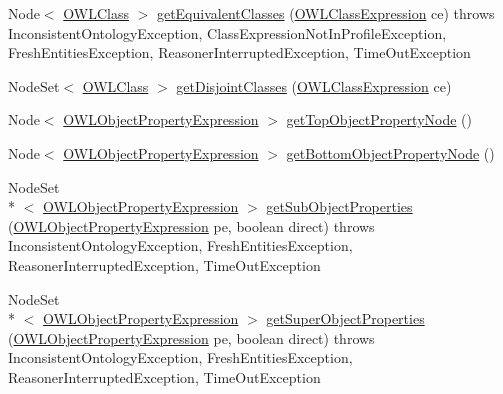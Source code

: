 \begin{DoxyCompactItemize}
\item 
Node$<$ \hyperlink{interfaceorg_1_1semanticweb_1_1owlapi_1_1model_1_1_o_w_l_class}{O\-W\-L\-Class} $>$ \hyperlink{classorg_1_1semanticweb_1_1owlapi_1_1reasoner_1_1structural_1_1_structural_reasoner_a41065ed19078e0e25c35153c2a22b53e}{get\-Equivalent\-Classes} (\hyperlink{interfaceorg_1_1semanticweb_1_1owlapi_1_1model_1_1_o_w_l_class_expression}{O\-W\-L\-Class\-Expression} ce)  throws Inconsistent\-Ontology\-Exception, Class\-Expression\-Not\-In\-Profile\-Exception, Fresh\-Entities\-Exception, Reasoner\-Interrupted\-Exception, Time\-Out\-Exception 
\item 
Node\-Set$<$ \hyperlink{interfaceorg_1_1semanticweb_1_1owlapi_1_1model_1_1_o_w_l_class}{O\-W\-L\-Class} $>$ \hyperlink{classorg_1_1semanticweb_1_1owlapi_1_1reasoner_1_1structural_1_1_structural_reasoner_a86e6fd413dccfed789d9855aa0d7c23d}{get\-Disjoint\-Classes} (\hyperlink{interfaceorg_1_1semanticweb_1_1owlapi_1_1model_1_1_o_w_l_class_expression}{O\-W\-L\-Class\-Expression} ce)
\item 
Node$<$ \hyperlink{interfaceorg_1_1semanticweb_1_1owlapi_1_1model_1_1_o_w_l_object_property_expression}{O\-W\-L\-Object\-Property\-Expression} $>$ \hyperlink{classorg_1_1semanticweb_1_1owlapi_1_1reasoner_1_1structural_1_1_structural_reasoner_a6e5ba65666e4ef1ba47b62392cca1b34}{get\-Top\-Object\-Property\-Node} ()
\item 
Node$<$ \hyperlink{interfaceorg_1_1semanticweb_1_1owlapi_1_1model_1_1_o_w_l_object_property_expression}{O\-W\-L\-Object\-Property\-Expression} $>$ \hyperlink{classorg_1_1semanticweb_1_1owlapi_1_1reasoner_1_1structural_1_1_structural_reasoner_ad8d4e20224afa7fa0f3e59549b979893}{get\-Bottom\-Object\-Property\-Node} ()
\item 
Node\-Set\\*
$<$ \hyperlink{interfaceorg_1_1semanticweb_1_1owlapi_1_1model_1_1_o_w_l_object_property_expression}{O\-W\-L\-Object\-Property\-Expression} $>$ \hyperlink{classorg_1_1semanticweb_1_1owlapi_1_1reasoner_1_1structural_1_1_structural_reasoner_ae04701c3c9c671b10b2a1c9b6c941911}{get\-Sub\-Object\-Properties} (\hyperlink{interfaceorg_1_1semanticweb_1_1owlapi_1_1model_1_1_o_w_l_object_property_expression}{O\-W\-L\-Object\-Property\-Expression} pe, boolean direct)  throws Inconsistent\-Ontology\-Exception, Fresh\-Entities\-Exception, Reasoner\-Interrupted\-Exception, Time\-Out\-Exception 
\item 
Node\-Set\\*
$<$ \hyperlink{interfaceorg_1_1semanticweb_1_1owlapi_1_1model_1_1_o_w_l_object_property_expression}{O\-W\-L\-Object\-Property\-Expression} $>$ \hyperlink{classorg_1_1semanticweb_1_1owlapi_1_1reasoner_1_1structural_1_1_structural_reasoner_abacb01a7f4d61ff377785063de0cb67e}{get\-Super\-Object\-Properties} (\hyperlink{interfaceorg_1_1semanticweb_1_1owlapi_1_1model_1_1_o_w_l_object_property_expression}{O\-W\-L\-Object\-Property\-Expression} pe, boolean direct)  throws Inconsistent\-Ontology\-Exception, Fresh\-Entities\-Exception, Reasoner\-Interrupted\-Exception, Time\-Out\-Exception 

\end{DoxyCompactItemize}
